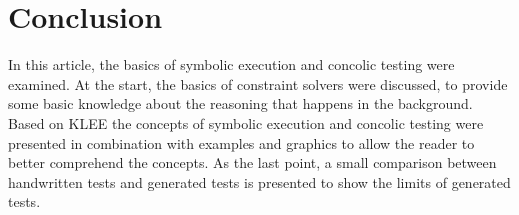 \section{Conclusion}
In this article, the basics of symbolic execution and concolic testing were examined. At the start, the basics of constraint solvers were discussed, to provide some basic knowledge about the reasoning that happens in the background. 
Based on KLEE the concepts of symbolic execution and concolic testing were presented in combination with examples and graphics to allow the reader to better comprehend the concepts.
As the last point, a small comparison between handwritten tests and generated tests is presented to show the limits of generated tests.